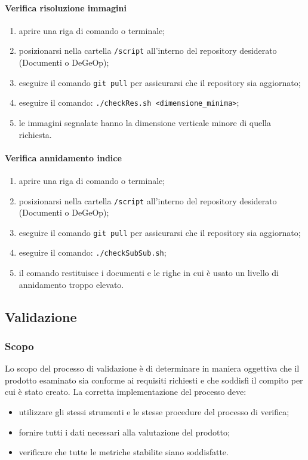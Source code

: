 	        \paragraph{Verifica risoluzione immagini} \label{sec:imageRes}
	        \begin{enumerate}
	        	\item aprire una riga di comando o terminale;
	        	\item posizionarsi nella cartella \texttt{/script} all'interno del repository desiderato (Documenti o DeGeOp);
	        	\item eseguire il comando \texttt{git pull} per assicurarsi che il repository sia aggiornato;
	        	\item eseguire il comando: \texttt{./checkRes.sh <dimensione\_minima>};
	        	\item le immagini segnalate hanno la dimensione verticale minore di quella richiesta.
	        \end{enumerate}
	        \paragraph{Verifica annidamento indice} \label{sec:ssPar}
	        \begin{enumerate}
	        	\item aprire una riga di comando o terminale;
	        	\item posizionarsi nella cartella \texttt{/script} all'interno del repository desiderato (Documenti o DeGeOp);
	        	\item eseguire il comando \texttt{git pull} per assicurarsi che il repository sia aggiornato;
	        	\item eseguire il comando: \texttt{./checkSubSub.sh};
	        	\item il comando restituisce i documenti e le righe in cui è usato un livello di annidamento troppo elevato.
	        \end{enumerate} 

    \subsection{Validazione}
    \subsubsection{Scopo}
    Lo scopo del processo di validazione è di determinare in maniera oggettiva che il prodotto esaminato sia conforme ai requisiti richiesti e che soddisfi il compito per cui è stato creato.  La corretta implementazione del processo deve:
    \begin{itemize}
        \item utilizzare gli stessi strumenti e le stesse procedure del processo di verifica;
        \item fornire tutti i dati necessari alla valutazione del prodotto;
        \item verificare che tutte le metriche stabilite siano soddisfatte.
    \end{itemize}
